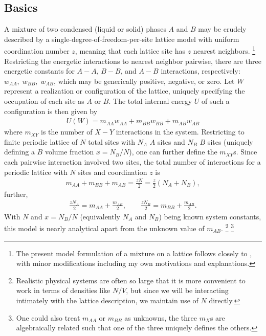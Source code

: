 \documentclass[10pt]{article}
\begin{document}
\subsection{Basics}
A mixture of two condensed (liquid or solid) phases $A$ and $B$ may be crudely described by a single-degree-of-freedom-per-site lattice model with uniform coordination number $z$, meaning that each lattice site has $z$ nearest neighbors. \footnote{The present model formulation of a mixture on a lattice follows closely to \cite{dill}, with minor modifications including my own motivations and explanations.} 
Restricting the energetic interactions to nearest neighbor pairwise, there are three energetic constants for $A-A$, $B-B$, and $A-B$ interactions, respectively: $w_{AA}, \; w_{BB}, \; w_{AB}$, which may be generically positive, negative, or zero.
Let $W$ represent a realization or configuration of the lattice, uniquely specifying the occupation of each site as $A$ or $B$.
The total internal energy $U$ of such a configuration is then given by
\begin{align}
    U(W) = m_{AA} w_{AA} + m_{BB} w_{BB} + m_{AB} w_{AB}
\end{align}
where $m_{XY}$ is the number of $X-Y$ interactions in the system.
Restricting to finite periodic lattice of $N$ total sites with $N_A$ $A$ sites and $N_B$ $B$ sites (uniquely defining a $B$ volume fraction $x = N_B / N$), one can further define the $m_{XY}$s.
Since each pairwise interaction involved two sites, the total number of interactions for a periodic lattice with $N$ sites and coordination $z$ is
\begin{align}
    m_{AA} + m_{BB} + m_{AB} = \frac{z N}{2} = \frac{z}{2} \left( N_A + N_B \right),
\end{align}
further,
\begin{align}
    \frac{z N_A}{2} = m_{AA} + \frac{m_{AB}}{2}, \quad\quad
    \frac{z N_B}{2} = m_{BB} + \frac{m_{AB}}{2}.
\end{align}
With $N$ and $x=N_B/N$ (equivalently $N_A$ and $N_B$) being known system constants, this model is nearly analytical apart from the unknown value of $m_{AB}$. \footnote{Realistic physical systems are often so large that it is more convenient to work in terms of densities like $N/V$, but since we will be interacting intimately with the lattice description, we maintain use of $N$ directly.} \footnote{One could also treat $m_{AA}$ or $m_{BB}$ as unknowns, the three $m_{X}$s are algebraically related such that one of the three uniquely defines the others.}
\end{document}
